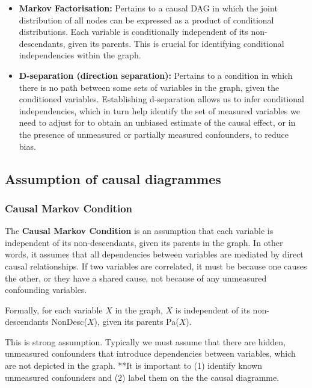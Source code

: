 \documentclass[
  singlecolumn]{report}
\providecommand{\tightlist}{%
  \setlength{\itemsep}{0pt}\setlength{\parskip}{0pt}}\usepackage{longtable,booktabs,array}
\begin{document}
\begin{itemize}
\tightlist
\item
  \textbf{Markov Factorisation:} Pertains to a causal DAG in which the
  joint distribution of all nodes can be expressed as a product of
  conditional distributions. Each variable is conditionally independent
  of its non-descendants, given its parents. This is crucial for
  identifying conditional independencies within the graph.
\item
  \textbf{D-separation (direction separation):} Pertains to a condition
  in which there is no path between some sets of variables in the graph,
  given the conditioned variables. Establishing d-separation allows us
  to infer conditional independencies, which in turn help identify the
  set of measured variables we need to adjust for to obtain an unbiased
  estimate of the causal effect, or in the presence of unmeasured or
  partially measured confounders, to reduce bias.
\end{itemize}

\hypertarget{assumption-of-causal-diagrammes}{%
\subsection{Assumption of causal
diagrammes}\label{assumption-of-causal-diagrammes}}

\hypertarget{causal-markov-condition}{%
\subsubsection{\texorpdfstring{\textbf{Causal Markov
Condition}}{Causal Markov Condition}}\label{causal-markov-condition}}

The \textbf{Causal Markov Condition} is an assumption that each variable
is independent of its non-descendants, given its parents in the graph.
In other words, it assumes that all dependencies between variables are
mediated by direct causal relationships. If two variables are
correlated, it must be because one causes the other, or they have a
shared cause, not because of any unmeasured confounding variables.

Formally, for each variable \(X\) in the graph, \(X\) is independent of
its non-descendants NonDesc(\(X\)), given its parents Pa(\(X\)).

This is strong assumption. Typically we must assume that there are
hidden, unmeasured confounders that introduce dependencies between
variables, which are not depicted in the graph. **It is important to (1)
identify known unmeasured confounders and (2) label them on the the
causal diagramme.
\end{document}
